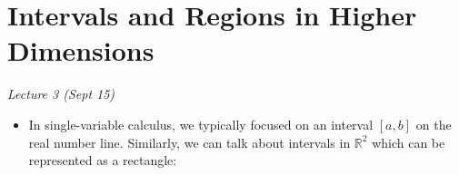 \section{Intervals and Regions in Higher Dimensions}
\textit{Lecture 3 (Sept 15)}
\begin{itemize}
    \item In single-variable calculus, we typically focused on an interval $[a,b]$ on the real number line. Similarly, we can talk about intervals in $\mathbb{R}^2$ which can be represented as a rectangle: 
    \begin{center}
\end{center}
\end{itemize}
